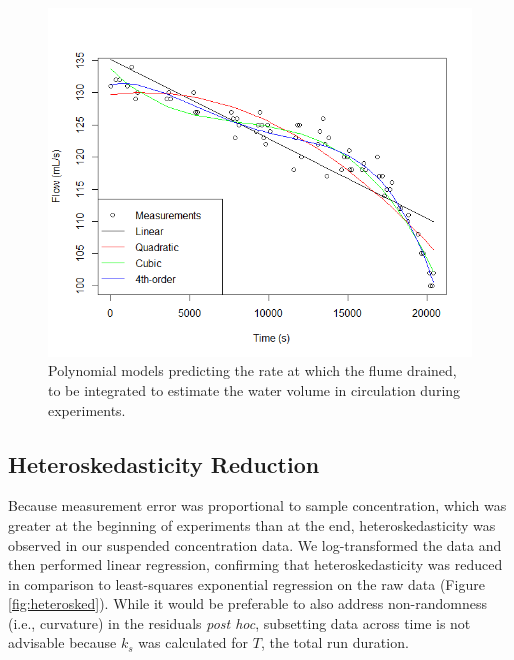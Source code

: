 \documentclass[geosciences,article,submit,moreauthors,pdftex]{Definitions/mdpi}
\begin{document}
\begin{figure}[ht]
\centering
\includegraphics[width=4.7in]{../pics/flumevol.png}
\caption{Polynomial models predicting the rate at which the flume drained, to be integrated to estimate the water volume in circulation during experiments.}
\label{fig:flumevol}
\end{figure}

\subsection{Heteroskedasticity Reduction}

Because measurement error was proportional to sample concentration, which was greater at the beginning of experiments than at the end, heteroskedasticity was observed in our suspended concentration data. We log-transformed the data and then performed linear regression, confirming that heteroskedasticity was reduced in comparison to least-squares exponential regression on the raw data (Figure \ref{fig:heterosked}). While it would be preferable to also address non-randomness (i.e., curvature) in the residuals \textit{post hoc}, subsetting data across time is not advisable because $k_s$ was calculated for $T$, the total run duration.
\end{document}
